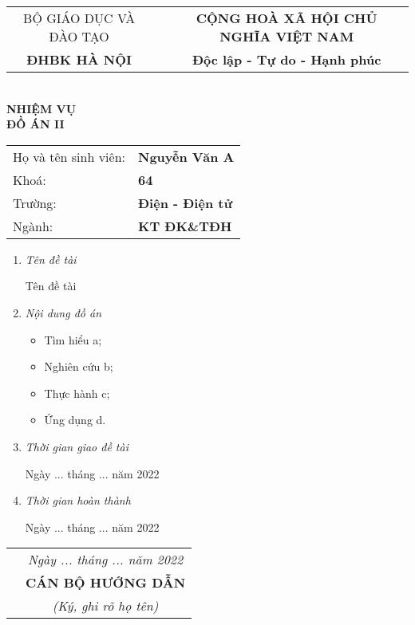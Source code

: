 \thispagestyle{empty}
\setlength{\parindent}{0cm}
\begin{center}
\fontsize{11}{0} \selectfont
\begin{tabular}{c p{0.15cm} c}
BỘ GIÁO DỤC VÀ ĐÀO TẠO & & \textbf{CỘNG HOÀ XÃ HỘI CHỦ NGHĨA VIỆT NAM}
\\
\textbf{ĐHBK HÀ NỘI} & & \textbf{Độc lập - Tự do - Hạnh phúc}
\end{tabular}
\\[1cm]
\fontsize{14}{0}\textbf{NHIỆM VỤ\\ĐỒ ÁN II}
\\[1cm]
\end{center}

\fontsize{12}{15} \selectfont
\begin{tabular}{l l}
Họ và tên sinh viên: & \textbf{Nguyễn Văn A}
\\
Khoá: & \textbf{64}
\\
Trường: & \textbf{Điện - Điện tử}
\\
Ngành: & \textbf{KT ĐK\&TĐH}
\end{tabular}

\begin{enumerate}[\itshape 1.]

\item \textit{Tên đề tài}

Tên đề tài

\item \textit{Nội dung đồ án}

\begin{itemize}
\renewcommand\labelitemi{--}
    \item Tìm hiểu a;
    \item Nghiên cứu b;
    \item Thực hành c;
    \item Ứng dụng d.
\end{itemize}

\item \textit{Thời gian giao đề tài}

Ngày ... tháng ... năm 2022

\item \textit{Thời gian hoàn thành}

Ngày ... tháng ... năm 2022

\end{enumerate}

\begin{tabular}{p{10cm} c}
\\
& \textit{Ngày ... tháng ... năm 2022}
\\
& \textbf{CÁN BỘ HƯỚNG DẪN}
\\[-5pt]
& \textit{(Ký, ghi rõ họ tên)}
\\
\end{tabular}
\newpage